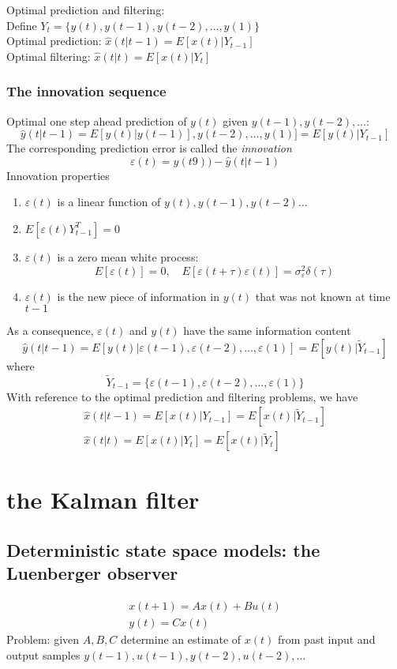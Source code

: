 \documentclass{book}
\theoremstyle{definition}
\theoremstyle{remark}
\theoremstyle{remark}
\begin{document}
Optimal prediction and filtering:\\
Define $Y_t = \{y(t),y(t-1),y(t-2),\dots,y(1)\}$\\
Optimal prediction: $\hat{x}(t|t-1)=E[x(t)|Y_{t-1}]$\\
Optimal filtering: $\hat{x}(t|t)=E[x(t)|Y_t]$

\subsubsection{The innovation sequence}
Optimal one step ahead prediction of $y(t)$ given $y(t-1),y(t-2),\dots$:
\[
    \hat{y}(t|t-1)=E[y(t)|y(t-1)],y(t-2),\dots,y(1)]=E[y(t)|Y_{t-1}]
\]
The corresponding prediction error is called the \emph{innovation}
\[
    \varepsilon(t)=y(t9))-\hat{y}(t|t-1)
\]
Innovation properties 
\begin{enumerate}
    \item $\varepsilon(t)$ is a linear function of $y(t),y(t-1),y(t-2)\dots$
    \item $E[\varepsilon(t)Y^T_{t-1}]=0$
    \item $\varepsilon(t)$ is a zero mean white process: 
        \[
            E[\varepsilon(t)]=0, \quad E[\varepsilon(t+\tau)\varepsilon(t)]=\sigma_\varepsilon^2\delta(\tau)
        \]
    \item $\varepsilon(t)$ is the new piece of information in $y(t)$ that was not known at time $t-1$
\end{enumerate}
As a consequence, $\varepsilon(t)$ and $y(t)$ have the same information content 
\[
    \hat{y}(t|t-1)=E[y(t)|\varepsilon(t-1),\varepsilon(t-2),\dots,\varepsilon(1)]=E[y(t)|\tilde{Y}_{t-1}]
\]
where
\[
    \tilde{Y}_{t-1}=\{\varepsilon(t-1),\varepsilon(t-2),\dots,\varepsilon(1)\}
\]
With reference to the optimal prediction and  filtering problems, we have 
\begin{gather*}
    \hat{x}(t|t-1)=E[x(t)|Y_{t-1}]=E[x(t)|\tilde{Y}_{t-1}]\\
    \hat{x}(t|t) = E[x(t)|Y_t]=E[x(t)|\tilde{Y}_t]
\end{gather*}

\section{the Kalman filter}
\subsection{Deterministic state space models: the Luenberger observer}
\begin{gather*}
    x(t+1)=Ax(t)+Bu(t)\\
    y(t)=Cx(t)
\end{gather*}
Problem: given $A,B,C$ determine an estimate of $x(t)$ from past input and output samples $y(t-1),u(t-1),y(t-2),u(t-2),\dots$
\end{document}
